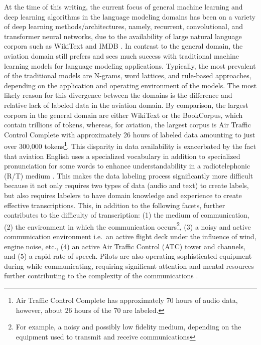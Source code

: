 \documentclass[12pt]{article}
\begin{document}
At the time of this writing, the current focus of general machine learning and deep learning algorithms in the language modeling domains has been on a
variety of deep learning methods/architectures, namely, recurrent, convolutional, and transformer neural networks, due to the availability of large
natural language corpora such as WikiText \cite{merity_pointer_2016} and IMDB \cite{maas_learning_2011}. In contrast to the general domain, the
aviation domain still prefers and sees much success with traditional machine learning models for language modeling applications. Typically, the most
prevalent of the traditional models are N-grams, word lattices, and rule-based approaches, depending on the application and operating environment of
the models. The most likely reason for this divergence between the domains is the difference and relative lack of labeled data in the aviation domain.
By comparison, the largest corpora in the general domain are either WikiText or the BookCorpus, which contain trillions of tokens, whereas, for
aviation, the largest corpus is Air Traffic Control Complete with approximately 26 hours of labeled data amounting to just over 300,000
tokens\footnote{Air Traffic Control Complete has approximately 70 hours of audio data, however, about 26 hours of the 70 are labeled.}. This disparity
in data availability is exacerbated by the fact that aviation English uses a specialized vocabulary in addition to specialized pronunciation for some
words to enhance understandability in a radiotelephonic (R/T) medium \cite{paltridge_handbook_2013}. This makes the data labeling process
significantly more difficult because it not only requires two types of data (audio and text) to create labels, but also requires labelers to have
domain knowledge and experience to create effective transcriptions. This, in addition to the following facets, further contributes to the difficulty
of transcription: (1) the medium of communication, (2) the environment in which the communication occurs\footnote{For example, a noisy and possibly
    low fidelity medium, depending on the equipment used to transmit and receive communications}, (3) a noisy and active communication environment
i.e.~an active flight deck under the influence of wind, engine noise, etc., (4) an active Air Traffic Control (ATC) tower and channels, and (5) a
rapid rate of speech. Pilots are also operating sophisticated equipment during while communicating, requiring significant attention and mental
resources further contributing to the complexity of the communications \cite{paltridge_handbook_2013}.
\end{document}
